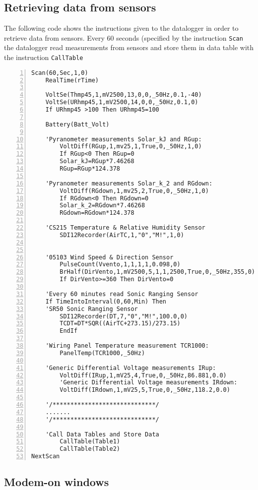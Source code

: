 \subsection{Retrieving data from sensors}
The following code shows the instructions given to the datalogger in order to retrieve data from sensors. Every 60 seconds (specified by the instruction {\tt Scan} the datalogger read measurements from sensors and store them in data table with the instruction {\tt CallTable}
\begin{lstlisting}[numbers=left, breaklines=true]
Scan(60,Sec,1,0)
    RealTime(rTime) 

    VoltSe(Thmp45,1,mV2500,13,0,0,_50Hz,0.1,-40)
    VoltSe(URhmp45,1,mV2500,14,0,0,_50Hz,0.1,0)
    If URhmp45 >100 Then URhmp45=100
    
    Battery(Batt_Volt)    

    'Pyranometer measurements Solar_kJ and RGup:
		VoltDiff(RGup,1,mv25,1,True,0,_50Hz,1,0)
		If RGup<0 Then RGup=0
		Solar_kJ=RGup*7.46268
		RGup=RGup*124.378
		
    'Pyranometer measurements Solar_k_2 and RGdown:
		VoltDiff(RGdown,1,mv25,2,True,0,_50Hz,1,0)
		If RGdown<0 Then RGdown=0
		Solar_k_2=RGdown*7.46268
		RGdown=RGdown*124.378
		
    'CS215 Temperature & Relative Humidity Sensor 
		SDI12Recorder(AirTC,1,"0","M!",1,0)
		
    
    '05103 Wind Speed & Direction Sensor
		PulseCount(Vvento,1,1,1,1,0.098,0)
		BrHalf(DirVento,1,mV2500,5,1,1,2500,True,0,_50Hz,355,0)
		If DirVento>=360 Then DirVento=0
		
    'Every 60 minutes read Sonic Ranging Sensor
    If TimeIntoInterval(0,60,Min) Then
    'SR50 Sonic Ranging Sensor
		SDI12Recorder(DT,7,"0","M!",100.0,0)
		TCDT=DT*SQR((AirTC+273.15)/273.15)
		EndIf
    
    'Wiring Panel Temperature measurement TCR1000:
		PanelTemp(TCR1000,_50Hz)
		
    'Generic Differential Voltage measurements IRup:
		VoltDiff(IRup,1,mV25,4,True,0,_50Hz,86.881,0.0)
		'Generic Differential Voltage measurements IRdown:
		VoltDiff(IRdown,1,mV25,5,True,0,_50Hz,118.2,0.0)
		
    '/*****************************/
    .......
    '/*****************************/
   	
    'Call Data Tables and Store Data
		CallTable(Table1)
		CallTable(Table2)
NextScan
\end{lstlisting}
\subsection{Modem-on windows}
